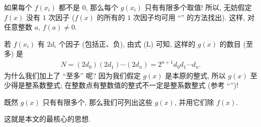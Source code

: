 如果每个 $f(x_i)$ 都不是 $0$, 那么每个 $g(x_i)$ 只有有限多个取值! 所以, 无妨假定 $f(x)$ 没有 $1$ 次因子 ($f(x)$ 的所有的 $1$ 次因子均可用 ``\RationalRootsOfPolynomialsOverQ '' 的方法找出). 这样, 对任意整数 $a$, $f(a) \neq 0$.

若 $f(x_i)$ 有 $2d_i$ 个因子 (包括正、负), 由式 (L) 可知, 这样的 $g(x)$ 的数目 (至多) 是
\begin{align*}
    N = (2d_0) (2d_1) \cdots (2d_n) = 2^{n+1} d_0 d_1 \cdots d_n.
\end{align*}
为什么我们加上了 ``至多'' 呢? 因为我们假定 $g(x)$ 是本原的整式, 所以 $g(x)$ 至少得是整系数整式; 在整数点有整数值的整式不一定是整系数整式 (参考 ``\GeneralizedBinomialCoefficients '')!

既然 $g(x)$ 只有有限多个, 那么我们可列出这些 $g(x)$, 并用它们除 $f(x)$.

这就是本文的最核心的思想.

